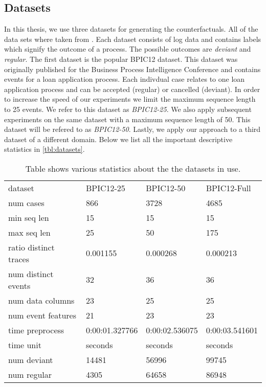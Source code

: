 \documentclass[./../../paper.tex]{subfiles}
\begin{document}
\subsection{Datasets}
\label{sec:dataset_description}
In this thesis, we use three datasets for generating the counterfactuals. All of the data sets where taken from \citeauthor{teinemaa_OutcomeOrientedPredictiveProcess_2018a}. Each dataset consists of log data and contains labels which signify the outcome of a process. The possible outcomes are \emph{deviant} and \emph{regular}. The first dataset is the popular BPIC12 dataset. This dataset was originally published for the Business Process Intelligence Conference and contains events for a loan application process. Each indivdual case relates to one loan application process and can be accepted (regular) or cancelled (deviant). In order to increase the speed of our experiments we limit the maximum sequence length to 25 events. We refer to this dataset as \emph{BPIC12-25}. We also apply subsequent experiments on the same dataset with a maximum sequence length of 50. This dataset will be refered to as \emph{BPIC12-50}. Lastly, we apply our approach to a third dataset of a different domain. Below we list all the important descriptive statistics in \autoref{tbl:datasets}.  

\begin{table}[htb]
    \centering
    \begin{tabular}{llll}
        dataset & BPIC12-25 & BPIC12-50 & BPIC12-Full \\
        num cases & 866 & 3728 & 4685 \\
        min seq len & 15 & 15 & 15 \\
        max seq len & 25 & 50 & 175 \\
        ratio distinct traces & 0.001155 & 0.000268 & 0.000213 \\
        num distinct events & 32 & 36 & 36 \\
        num data columns & 23 & 25 & 25 \\
        num event features & 21 & 23 & 23 \\
        time preprocess & 0:00:01.327766 & 0:00:02.536075 & 0:00:03.541601 \\
        time unit & seconds & seconds & seconds \\
        num deviant & 14481 & 56996 & 99745 \\
        num regular & 4305 & 64658 & 86948 \\
        \end{tabular}
    \caption{Table shows various statistics about the the datasets in use.}
    \label{tbl:datasets}
\end{table}
\end{document}
